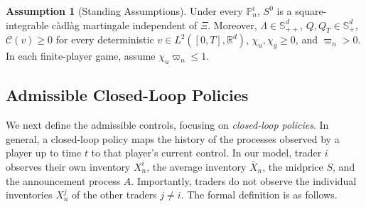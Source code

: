 \documentclass[12pt]{article}
\numberwithin{equation}{section}
\theoremstyle{definition}
\newtheorem{assumption}[theorem]{Assumption}
\begin{document}
\begin{assumption}[Standing Assumptions]\label{ass:standing_model}
Under every \(\mathbb P_n^i\), \(S^0\) is a square-integrable càdlàg martingale
independent of \(\Xi\). Moreover, \(\Lambda\in\mathbb S_{++}^d\),
\(Q,Q_T\in\mathbb S_+^d\), \(\mathcal C(v)\geq0\) for every deterministic
\(v\in L^2([0,T],\mathbb R^d)\), \(\chi_u,\chi_g\geq0\), and
\(\varpi_n>0\). In each finite-player game, assume
\(\chi_u\varpi_n\leq1\).
\end{assumption}
\subsection{Admissible Closed-Loop Policies}

We next define the admissible controls, focusing on \emph{closed-loop policies}. In
general, a closed-loop policy maps the history of the processes observed by a
player up to time \(t\) to that player's current control. In our model, trader
\(i\) observes their own inventory \(X_n^i\), the average inventory \(\bar X_n\),
the midprice \(S\), and the announcement process \(A\). Importantly, traders do
not observe the individual inventories \(X_n^j\) of the other traders
\(j\ne i\). The formal definition is as follows.
\end{document}
